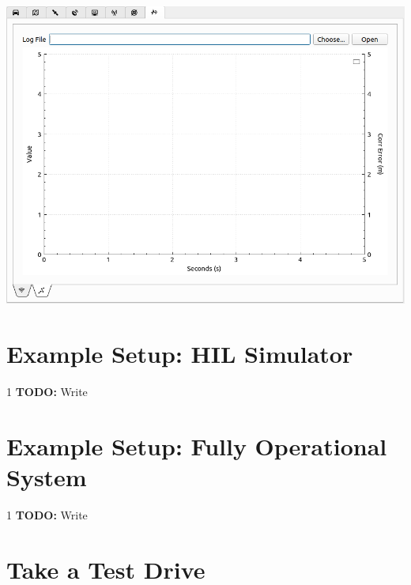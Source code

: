 \documentclass[12pt]{article} %
\def\printtodos{0}
\newcommand{\todo}[1]{
  \if\printtodos1
      {\color{red} \textbf{TODO:} #1}
  \fi}
\begin{document}
\begin{minipage}{0.3\linewidth}
\noindent \includegraphics[width=\textwidth]{./screens/Log3.png}
\end{minipage}





\section{Example Setup: HIL Simulator}

\todo{Write}

\section{Example Setup: Fully Operational System}

\todo{Write}

\section{Take a Test Drive}
\end{document}
